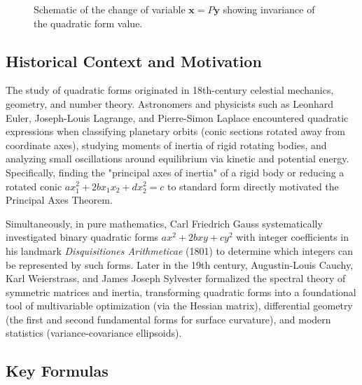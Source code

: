 \documentclass[11pt, letterpaper]{article}
\theoremstyle{definition}
\theoremstyle{remark}
\begin{document}
\begin{figure}[htbp]
\caption{Schematic of the change of variable $\mathbf{x} = P\mathbf{y}$ showing invariance of the quadratic form value.}
\end{figure}

\subsection{Historical Context and Motivation}

The study of quadratic forms originated in 18th-century celestial mechanics, geometry, and number theory. Astronomers and physicists such as Leonhard Euler, Joseph-Louis Lagrange, and Pierre-Simon Laplace encountered quadratic expressions when classifying planetary orbits (conic sections rotated away from coordinate axes), studying moments of inertia of rigid rotating bodies, and analyzing small oscillations around equilibrium via kinetic and potential energy. Specifically, finding the "principal axes of inertia" of a rigid body or reducing a rotated conic $ax_1^2 + 2bx_1x_2 + dx_2^2 = c$ to standard form directly motivated the Principal Axes Theorem.

Simultaneously, in pure mathematics, Carl Friedrich Gauss systematically investigated binary quadratic forms $ax^2 + 2bxy + cy^2$ with integer coefficients in his landmark \emph{Disquisitiones Arithmeticae} (1801) to determine which integers can be represented by such forms. Later in the 19th century, Augustin-Louis Cauchy, Karl Weierstrass, and James Joseph Sylvester formalized the spectral theory of symmetric matrices and inertia, transforming quadratic forms into a foundational tool of multivariable optimization (via the Hessian matrix), differential geometry (the first and second fundamental forms for surface curvature), and modern statistics (variance-covariance ellipsoids).

\subsection{Key Formulas}
\end{document}
